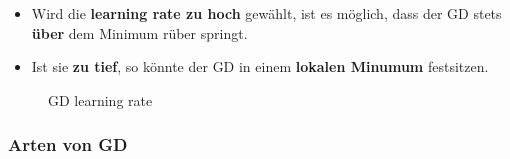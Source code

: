 \begin{itemize}
	\item Wird die \textbf{learning rate zu hoch} gewählt, ist es möglich, dass der GD stets \textbf{über} dem Minimum rüber springt.
	\item Ist sie \textbf{zu tief}, so könnte der GD in einem \textbf{lokalen Minumum} festsitzen.
\end{itemize}

\begin{figure}
    \centering
    \qquad
    \caption{GD learning rate}%
    \label{fig:gd_learning_rate}%
\end{figure}


\newpage
\subsubsection{Arten von GD}

